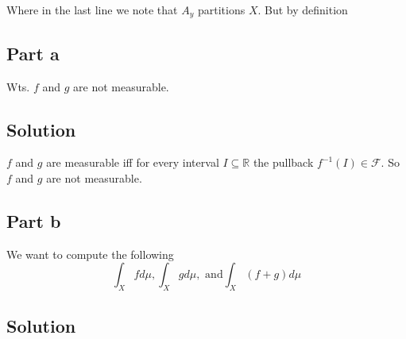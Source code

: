 Where in the last line we note that $A_y$ partitions $X$.
But by definition
\eqe{

}

\subsection*{Part a}
Wts. $f$ and $g$ are not measurable.
\subsection*{Solution}
$f$ and $g$ are measurable iff for every interval $I \subseteq \mathbb{R}$ the pullback $f^{-1}(I) \in \mathcal{F}$.
So $f$ and $g$ are not measurable.

\subsection*{Part b}
We want to compute the following
$$\int_X f d\mu, \int_X g d\mu, \textrm{ and} \int_X(f+g)d\mu$$

\subsection*{Solution}

